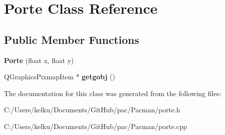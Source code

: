 \hypertarget{class_porte}{}\section{Porte Class Reference}
\label{class_porte}
\subsection*{Public Member Functions}
\begin{DoxyCompactItemize}
\item 
\hypertarget{class_porte_a0b907c13de06831e6cf09d5c82d72773}{}{\bfseries Porte} (float x, float y)\label{class_porte_a0b907c13de06831e6cf09d5c82d72773}

\item 
\hypertarget{class_porte_a1582c3c68d302cea42103ed7c21d8ac9}{}Q\+Graphics\+Pixmap\+Item $\ast$ {\bfseries getgobj} ()\label{class_porte_a1582c3c68d302cea42103ed7c21d8ac9}

\end{DoxyCompactItemize}


The documentation for this class was generated from the following files\+:\begin{DoxyCompactItemize}
\item 
C\+:/\+Users/kelku/\+Documents/\+Git\+Hub/pac/\+Pacman/porte.\+h\item 
C\+:/\+Users/kelku/\+Documents/\+Git\+Hub/pac/\+Pacman/porte.\+cpp\end{DoxyCompactItemize}
